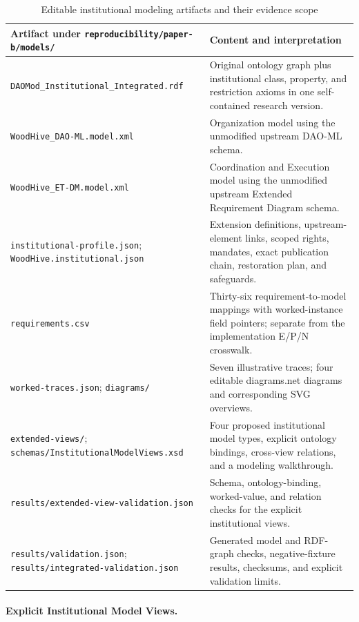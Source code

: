 \documentclass[journal]{IEEEtran}
\begin{document}
\begin{table}[t]
\centering
\caption{Editable institutional modeling artifacts and their evidence scope}
\label{tab:model_artifacts}
\renewcommand{\arraystretch}{1.12}
\begin{tabular}{p{5.4cm}p{10.8cm}}
\hline
\textbf{Artifact under \texttt{reproducibility/paper-b/models/}} &
\textbf{Content and interpretation}\\
\hline
\texttt{DAOMod\_Institutional\_Integrated.rdf} &
Original ontology graph plus institutional class, property, and
restriction axioms in one self-contained research version.\\
\texttt{WoodHive\_DAO-ML.model.xml} &
Organization model using the unmodified upstream DAO-ML schema.\\
\texttt{WoodHive\_ET-DM.model.xml} &
Coordination and Execution model using the unmodified upstream
Extended Requirement Diagram schema.\\
\texttt{institutional-profile.json};
\texttt{WoodHive.institutional.json} &
Extension definitions, upstream-element links, scoped rights,
mandates, exact publication chain, restoration plan, and safeguards.\\
\texttt{requirements.csv} &
Thirty-six requirement-to-model mappings with worked-instance
field pointers; separate from the implementation E/P/N crosswalk.\\
\texttt{worked-traces.json}; \texttt{diagrams/} &
Seven illustrative traces; four editable diagrams.net diagrams
and corresponding SVG overviews.\\
\texttt{extended-views/};
\texttt{schemas/InstitutionalModelViews.xsd} &
Four proposed institutional model types, explicit ontology
bindings, cross-view relations, and a modeling walkthrough.\\
\texttt{results/extended-view-validation.json} &
Schema, ontology-binding, worked-value, and relation checks
for the explicit institutional views.\\
\texttt{results/validation.json};
\texttt{results/integrated-validation.json} &
Generated model and RDF-graph checks, negative-fixture results,
checksums, and explicit validation limits.\\
\hline
\end{tabular}
\end{table}

\paragraph{Explicit Institutional Model Views.}
\end{document}
